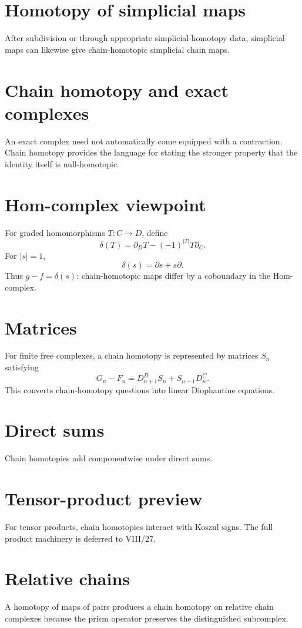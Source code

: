 \section{Homotopy of simplicial maps}
After subdivision or through appropriate simplicial homotopy data, simplicial
maps can likewise give chain-homotopic simplicial chain maps.

\section{Chain homotopy and exact complexes}
An exact complex need not automatically come equipped with a contraction.
Chain homotopy provides the language for stating the stronger property that the
identity itself is null-homotopic.

\section{Hom-complex viewpoint}
For graded homomorphisms \(T:C\to D\), define
\[
\delta(T)=\partial_D T-(-1)^{|T|}T\partial_C.
\]
For \(|s|=1\),
\[
\delta(s)=\partial s+s\partial.
\]
Thus \(g-f=\delta(s)\): chain-homotopic maps differ by a coboundary in the
Hom-complex.

\section{Matrices}
For finite free complexes, a chain homotopy is represented by matrices
\(S_n\) satisfying
\[
G_n-F_n=D^D_{n+1}S_n+S_{n-1}D^C_n.
\]
This converts chain-homotopy questions into linear Diophantine equations.

\section{Direct sums}
Chain homotopies add componentwise under direct sums.

\section{Tensor-product preview}
For tensor products, chain homotopies interact with Koszul signs.  The full
product machinery is deferred to VIII/27.

\section{Relative chains}
A homotopy of maps of pairs produces a chain homotopy on relative chain
complexes because the prism operator preserves the distinguished subcomplex.

